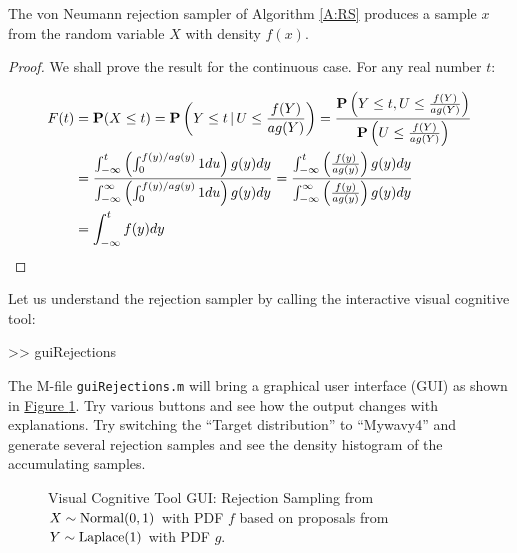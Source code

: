 \begin{prop}  The von Neumann rejection sampler of Algorithm \ref*{A:RS} produces a sample $x$ from the random variable $X$ with density $f(x)$.
\begin{proof}
We shall prove the result for the continuous case. For any real number $t$:

\begin{eqnarray*}
F(t) &= \mathbf{P}(X \leq t) = \mathbf{P}\left(Y \leq t  \, | \, U \leq\frac{f(Y)}{ag(Y)} \right)
=\frac{\mathbf{P}\left(Y \leq t, U \leq\frac{f(Y)}{ag(Y)} \right)}{\mathbf{P}\left(U \leq\frac{f(Y)}{ag(Y)}\right)}\\
&=\frac{\int^t_{-\infty}\left(\int^{f(y)/ag(y)}_0 1 du\right)g(y)dy}{\int^{\infty}_{-\infty}\left(\int^{f(y)/ag(y)}_0 1 du\right)g(y)dy}
=\frac{\int^t_{-\infty}\left(\frac{f(y)}{ag(y)} \right)g(y)dy}{\int^{\infty}_{-\infty}\left(\frac{f(y)}{ag(y)} \right)g(y)dy}\\
&=\int^t_{-\infty}f(y)dy
\end{eqnarray*}
\end{proof}
\end{prop}

\begin{labwork}\label{LW:guiRejectionsNormal01}
Let us understand the rejection sampler by calling the interactive visual cognitive tool:
\begin{VrbM}
>> guiRejections
\end{VrbM}
The M-file {\tt guiRejections.m} will bring a graphical user interface (GUI) as shown in \hyperref[F:guiRejectionsNormal01]{Figure \ref*{F:guiRejectionsNormal01}}.  Try various buttons and see how the output changes with explanations.  Try switching the ``Target distribution'' to ``Mywavy4'' and generate several rejection samples and see the density histogram of the accumulating samples.
\end{labwork}

\begin{figure}[htpb]
\caption{Visual Cognitive Tool GUI: Rejection Sampling from $X \sim \mbox{{\rm Normal}}(0,1)$ with PDF $f$ based on proposals from $Y \sim \mbox{{\rm Laplace}}(1)$ with PDF $g$.\label{F:guiRejectionsNormal01}}
\centering   {}
\end{figure}


